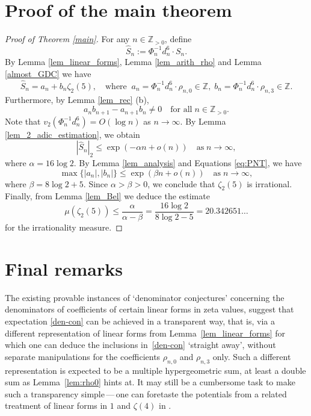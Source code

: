 \documentclass[12pt]{article}
\let\le\leqslant
\theoremstyle{remark}
\numberwithin{equation}{section}
\begin{document}
\section{Proof of the main theorem}

\begin{proof}[Proof of Theorem \textup{\ref{main}}]
For any $n \in \mathbb{Z}_{>0}$, define
\[
\widehat{S}_n := \Phi_n^{-1}d_n^6 \cdot S_n.
\]
By Lemma \ref{lem_linear_forms}, Lemma \ref{lem_arith_rho} and Lemma \ref{almost_GDC} we have
\[
\widehat{S}_n = a_n + b_n \zeta_2(5),
\quad\text{where}\;\;
a_n = \Phi_n^{-1}d_n^6 \cdot \rho_{n,0} \in \mathbb{Z}, \;
b_n = \Phi_n^{-1}d_n^6 \cdot \rho_{n,3} \in \mathbb{Z}.
\]
Furthermore, by Lemma \ref{lem_rec} (b),
\[
a_n b_{n+1} - a_{n+1}b_n \neq 0 \quad \text{for all}\; n \in \mathbb{Z}_{>0}.
\]
Note that $v_2(\Phi_n^{-1}d_n^6) = O(\log n)$ as $n \to \infty$. By Lemma \ref{lem_2_adic_estimation}, we obtain
\[
|\widehat{S}_n|_2 \le \exp(-\alpha n + o(n)) \quad\text{as}\; n \to \infty,
\]
where $\alpha = 16\log 2$.
By Lemma \ref{lem_analysis} and Equations \eqref{eq:PNT}, we have
\[
\max\{ |a_n|, |b_n| \} \le \exp(\beta n + o(n)) \quad \text{as}\; n \to \infty,
\]
where $\beta = 8\log 2 + 5$.
Since $\alpha > \beta >0$, we conclude that $\zeta_2(5)$ is irrational.
Finally, from Lemma \ref{lem_Bel} we deduce the estimate
\[
\mu(\zeta_2(5)) \le \frac{\alpha}{\alpha-\beta} = \frac{16\log 2}{8\log 2 - 5} = 20.342651\dots
\]
for the irrationality measure.
\end{proof}

\section{Final remarks}

The existing provable instances of `denominator conjectures' concerning the denominators of coefficients of certain linear forms in zeta values, suggest that expectation \eqref{den-con} can be achieved in a transparent way, that is, via a different representation of linear forms from Lemma~\ref{lem_linear_forms} for which one can deduce the inclusions in~\eqref{den-con} `straight away', without separate manipulations for the coefficients $\rho_{n,0}$ and $\rho_{n,3}$ only.
Such a different representation is expected to be a multiple hypergeometric sum, at least a double sum as Lemma~\ref{lem:rho0} hints at.
It may still be a cumbersome task to make such a transparency simple\,---\,one can foretaste the potentials from a related treatment of linear forms in $1$ and $\zeta(4)$ in \cite[Sect.~3]{MZ2020}.
\end{document}
